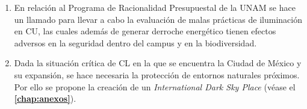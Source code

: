 \begin{enumerate}[I]
\item En relación al Programa de Racionalidad Presupuestal de la UNAM se hace un llamado para llevar a cabo la evaluación de malas prácticas de iluminación en CU, las cuales además de generar derroche energético tienen efectos adversos en la seguridad dentro del campus y en la biodiversidad.

\item Dada la situación crítica de CL en la que se encuentra la Ciudad de México y su expansión, se hace necesaria la protección de entornos naturales próximos. Por ello se propone la creación de un \textit{International Dark Sky Place} (véase el \textbf{\autoref{chap:anexos}}).

\end{enumerate}